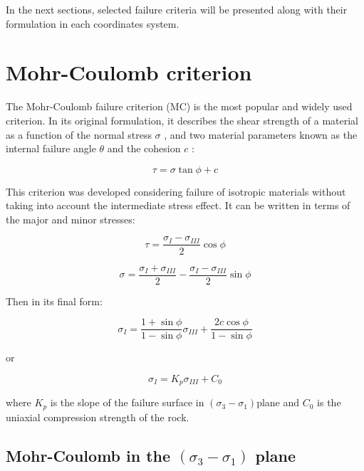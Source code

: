 In the next sections, selected failure criteria will be presented along with their formulation in each coordinates system. 

\section{Mohr-Coulomb criterion}

The Mohr-Coulomb failure criterion (MC) is the most popular and widely used criterion. In its original formulation, it describes the shear strength of a material as a function of the normal stress $\sigma$ , and two material parameters known as the internal failure angle $\theta$ and the cohesion $c$ :

\begin{equation}
    \tau = \sigma \tan \phi + c
\end{equation}

This criterion was developed considering failure of isotropic materials without taking into account the intermediate stress effect. It can be written in terms of the major and minor stresses: 

\begin{equation}
    \tau = \frac{\sigma_I - \sigma_{III}}{2} \cos \phi
\end{equation}

\begin{equation}
    \sigma = \frac{\sigma_I + \sigma_{III}}{2} - \frac{\sigma_I - \sigma_{III}}{2} \sin \phi
\end{equation}

Then in its final form:

\begin{equation} \label{eq2:finalform}
    \sigma_{I}=\frac{1+\sin \phi}{1-\sin \phi} \sigma_{I I I}+\frac{2 c \cos \phi}{1-\sin \phi}
\end{equation}

or

\begin{equation}\label{eq2:sigIK}
    \sigma_I = K_p \sigma_{III} + C_0
\end{equation}

where $K_p$ is the slope of the failure surface in $(\sigma_3 -\sigma_1)$plane and $C_0$ is the uniaxial compression strength of the rock. 

\subsection{Mohr-Coulomb in the \texorpdfstring{$(\sigma_3 -\sigma_1)$}{sigma 3 - sigma 1} plane}

